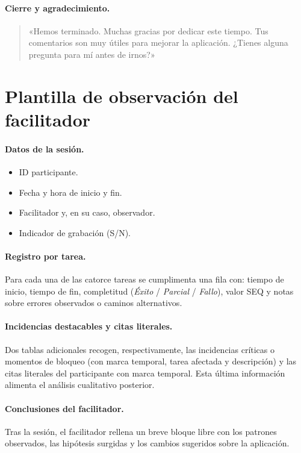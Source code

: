 \paragraph{Cierre y agradecimiento.}
\begin{quote}
«Hemos terminado. Muchas gracias por dedicar este tiempo. Tus comentarios son muy útiles
para mejorar la aplicación. ¿Tienes alguna pregunta para mí antes de irnos?»
\end{quote}

\section{Plantilla de observación del facilitador}

\paragraph{Datos de la sesión.}
\begin{itemize}
\item ID participante.
\item Fecha y hora de inicio y fin.
\item Facilitador y, en su caso, observador.
\item Indicador de grabación (S/N).
\end{itemize}

\paragraph{Registro por tarea.}
Para cada una de las catorce tareas se cumplimenta una fila con: tiempo de inicio, tiempo de
fin, completitud (\textit{Éxito} / \textit{Parcial} / \textit{Fallo}), valor SEQ y notas
sobre errores observados o caminos alternativos.

\paragraph{Incidencias destacables y citas literales.}
Dos tablas adicionales recogen, respectivamente, las incidencias críticas o momentos de
bloqueo (con marca temporal, tarea afectada y descripción) y las citas literales del
participante con marca temporal. Esta última información alimenta el análisis cualitativo
posterior.

\paragraph{Conclusiones del facilitador.}
Tras la sesión, el facilitador rellena un breve bloque libre con los patrones observados,
las hipótesis surgidas y los cambios sugeridos sobre la aplicación.

